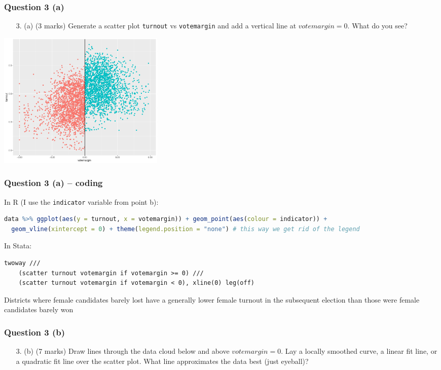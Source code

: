 \documentclass[xcolor=table,dvipsnames]{beamer}
\begin{document}
\begin{frame}
\frametitle{Question 3 (a)}
\begin{enumerate}
\item[3.] (a) (3 marks) Generate a scatter plot \texttt{turnout} vs \texttt{votemargin} and add a vertical line at $votemargin=0$. What do you see? \pause
\end{enumerate}

\begin{center}
\includegraphics[width=80mm]{pictures/week_22_3scatt.pdf} 
\end{center}
\end{frame}

\begin{frame}[fragile]
\frametitle{Question 3 (a) -- coding}
In R (I use the \texttt{indicator} variable from point b):
\begin{lstlisting}[language=R]
data %>% ggplot(aes(y = turnout, x = votemargin)) + geom_point(aes(colour = indicator)) + 
  geom_vline(xintercept = 0) + theme(legend.position = "none") # this way we get rid of the legend
\end{lstlisting} \pause

In Stata:
\begin{lstlisting}
twoway ///
	(scatter turnout votemargin if votemargin >= 0) ///
	(scatter turnout votemargin if votemargin < 0), xline(0) leg(off)
\end{lstlisting} \pause

Districts where female candidates barely lost have a generally lower female turnout in the subsequent election than those were female candidates barely won
\end{frame}

\begin{frame}
\frametitle{Question 3 (b)}
\begin{enumerate}
\item[3.] (b) (7 marks) Draw lines through the data cloud below and above $votemargin=0$. Lay a locally smoothed curve, a linear fit line, or a quadratic fit line over the scatter plot. What line approximates the data best (just eyeball)?
\end{enumerate}
\end{frame}
\end{document}
